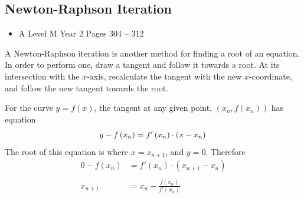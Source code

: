 \documentclass[11pt, a4paper]{article}
\begin{document}
\subsection{Newton-Raphson Iteration}
\begin{itemize}
\item A Level M Year 2 \hspace{1cm} \phantom{ AS / } Pages 304 -- 312
\end{itemize} \par
\begin{figure}[H]
\centering
{}
\end{figure}
A Newton-Raphson iteration is another method for finding a root of an equation. In order to perform one, draw a tangent and follow it towards a root. At its intersection with the $x$-axis, recalculate the tangent with the new $x$-coordinate, and follow the new tangent towards the root. \newline \par

For the curve $y=f(x)$, the tangent at any given point, $\left(x_{n},f\left(x_{n}\right)\right)$ has equation
\begin{equation*}
y-f\left(x_{n}\right)=f'\left(x_{n}\right)\cdot\left(x-x_{n}\right) \\
\end{equation*}
The root of this equation is where $x=x_{n+1}$, and $y=0$. Therefore
\begin{align*}
0-f\left(x_{n}\right)&=f'\left(x_{n}\right)\cdot\left(x_{n+1}-x_{n}\right) \\
& \\
x_{n+1}&=x_{n}-\frac{f\left(x_{n}\right)}{f'\left(x_{n}\right)}
\end{align*}
\vspace{0.5cm}
\end{document}
